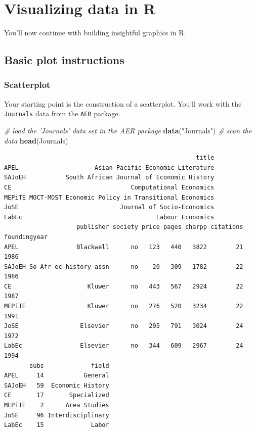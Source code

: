 \documentclass[
]{book}
\newenvironment{Shaded}{\begin{snugshade}}{\end{snugshade}}
\newcommand{\CommentTok}[1]{\textcolor[rgb]{0.56,0.35,0.01}{\textit{#1}}}
\newcommand{\KeywordTok}[1]{\textcolor[rgb]{0.13,0.29,0.53}{\textbf{#1}}}
\newcommand{\NormalTok}[1]{#1}
\newcommand{\StringTok}[1]{\textcolor[rgb]{0.31,0.60,0.02}{#1}}
\begin{document}
\begin{learncheck}

\end{learncheck}

\hypertarget{data-viz}{%
\chapter{Visualizing data in R}\label{data-viz}}

You'll now continue with building insightful graphics in R.

\hypertarget{basic-plot-instructions}{%
\section{Basic plot instructions}\label{basic-plot-instructions}}

\hypertarget{scatterplot}{%
\subsection{Scatterplot}\label{scatterplot}}

Your starting point is the construction of a scatterplot. You'll work with the \texttt{Journals} data from the \texttt{AER} package.

\begin{Shaded}
\begin{Highlighting}[]
\CommentTok{# load the 'Journals' data set in the AER package}
\KeywordTok{data}\NormalTok{(}\StringTok{"Journals"}\NormalTok{)}
\CommentTok{# scan the data}
\KeywordTok{head}\NormalTok{(Journals)}
\end{Highlighting}
\end{Shaded}

\begin{verbatim}
                                                     title
APEL                     Asian-Pacific Economic Literature
SAJoEH           South African Journal of Economic History
CE                                 Computational Economics
MEPiTE MOCT-MOST Economic Policy in Transitional Economics
JoSE                            Journal of Socio-Economics
LabEc                                     Labour Economics
                    publisher society price pages charpp citations foundingyear
APEL                Blackwell      no   123   440   3822        21         1986
SAJoEH So Afr ec history assn      no    20   309   1782        22         1986
CE                     Kluwer      no   443   567   2924        22         1987
MEPiTE                 Kluwer      no   276   520   3234        22         1991
JoSE                 Elsevier      no   295   791   3024        24         1972
LabEc                Elsevier      no   344   609   2967        24         1994
       subs             field
APEL     14           General
SAJoEH   59  Economic History
CE       17       Specialized
MEPiTE    2      Area Studies
JoSE     96 Interdisciplinary
LabEc    15             Labor
\end{verbatim}
\end{document}

